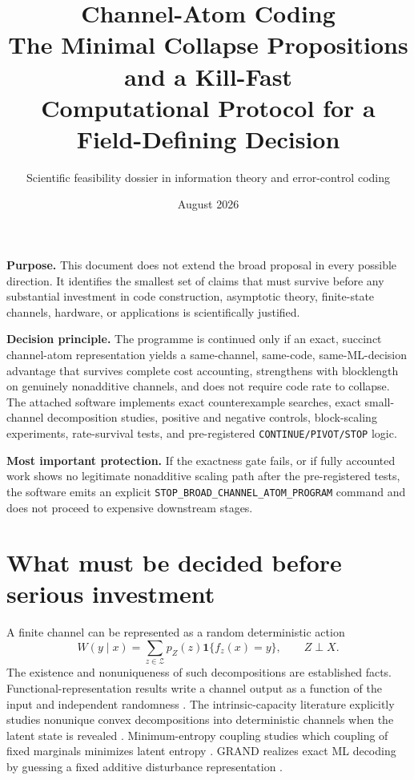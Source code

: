 \documentclass[11pt]{article}
\title{\vspace{-0.8cm}\textbf{Channel-Atom Coding}\\[3pt]
\Large The Minimal Collapse Propositions and a Kill-Fast\\
Computational Protocol for a Field-Defining Decision}
\author{Scientific feasibility dossier in information theory and error-control coding}
\date{August 2026}
\theoremstyle{definition}
\theoremstyle{remark}
\newcommand{\Z}{\mathcal Z}
\newcommand{\one}{\mathbf 1}
\begin{document}
\maketitle
\thispagestyle{empty}

\begin{executivebox}
\textbf{Purpose.} This document does not extend the broad proposal in every possible direction. It identifies the smallest set of claims that must survive before any substantial investment in code construction, asymptotic theory, finite-state channels, hardware, or applications is scientifically justified.

\textbf{Decision principle.} The programme is continued only if an exact, succinct channel-atom representation yields a same-channel, same-code, same-ML-decision advantage that survives complete cost accounting, strengthens with blocklength on genuinely nonadditive channels, and does not require code rate to collapse. The attached software implements exact counterexample searches, exact small-channel decomposition studies, positive and negative controls, block-scaling experiments, rate-survival tests, and pre-registered \texttt{CONTINUE/PIVOT/STOP} logic.

\textbf{Most important protection.} If the exactness gate fails, or if fully accounted work shows no legitimate nonadditive scaling path after the pre-registered tests, the software emits an explicit \texttt{STOP\_BROAD\_CHANNEL\_ATOM\_PROGRAM} command and does not proceed to expensive downstream stages.
\end{executivebox}

\tableofcontents
\newpage

\section{What must be decided before serious investment}

A finite channel can be represented as a random deterministic action
\begin{equation}
 W(y\mid x)=\sum_{z\in\Z}p_Z(z)\one\{f_z(x)=y\},\qquad Z\perp X.
 \label{eq:representation}
\end{equation}
The existence and nonuniqueness of such decompositions are established facts. Functional-representation results write a channel output as a function of the input and independent randomness \cite{LiElGamal2018}. The intrinsic-capacity literature explicitly studies nonunique convex decompositions into deterministic channels when the latent state is revealed \cite{Yang2019}. Minimum-entropy coupling studies which coupling of fixed marginals minimizes latent entropy \cite{Kovacevic2015,Cicalese2019,Compton2023}. GRAND realizes exact ML decoding by guessing a fixed additive disturbance representation \cite{Duffy2019}.
\end{document}

